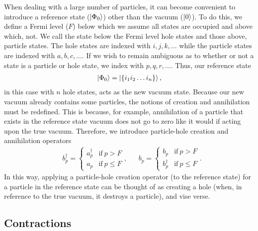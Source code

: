 \documentclass[Dual]{msu-thesis}
\begin{document}
When dealing with a large number of particles, it can become convenient to introduce a reference state ($\ket{\Phi_0}$) other than the vacuum ($\ket{0}$). To do this, we define a Fermi level ($F$) below which we assume all states are occupied and above which, not. We call the state below the Fermi level hole states and those above, particle states. The hole states are indexed with $i,j,k,...$ while the particle states are indexed with $a,b,c,...$. If we wish to remain ambiguous as to whether or not a state is a particle or hole state, we index with $p,q,r,...$. Thus, our reference state
\begin{align}
\ket{\Phi_0}=\ket{\{i_1i_2\ldots i_n\}},
\end{align}
in this case with $n$ hole states, acts as the new vacuum state. Because our new vacuum already contains some particles, the notions of creation and annihilation must be redefined. This is because, for example, annihilation of a particle that exists in the reference state vacuum does not go to zero like it would if acting upon the true vacuum. Therefore, we introduce particle-hole creation and annihilation operators
\begin{align}
&
b^\dagger_p
=
\begin{cases}
a^\dagger_p & \text{if} \ p > F
\\
a_p & \text{if} \ p \leq F
\end{cases},
&&
b_p
=
\begin{cases}
b_p & \text{if} \ p > F
\\
b^\dagger_p & \text{if} \ p \leq F
\end{cases}.
\end{align}
In this way, applying a particle-hole creation operator (to the reference state) for a particle in the reference state can be thought of as creating a hole (when, in reference to the true vacuum, it destroys a particle), and vise verse.

\subsection{Contractions} 
\end{document}
